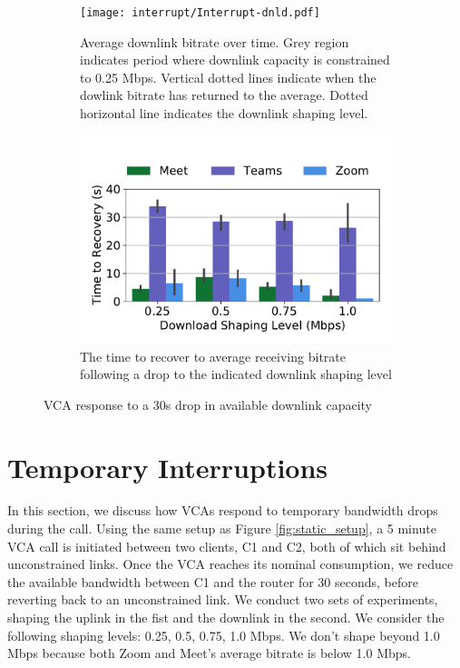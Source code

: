 
\begin{figure}[h!]
\begin{subfigure}[t]{.5\textwidth}
   \centering
    \texttt{[image: interrupt/Interrupt-dnld.pdf]}
    \captionsetup{width=.9\linewidth}
    \caption{Average downlink bitrate over time. Grey region indicates period where downlink capacity is constrained to 0.25 Mbps. Vertical dotted lines indicate when the dowlink bitrate has returned to the average. Dotted horizontal line indicates the downlink shaping level.}
    \label{fig:ts-dnld}
\end{subfigure}
\begin{subfigure}[t]{.5\textwidth}
  \centering
    \includegraphics[width=1\textwidth,keepaspectratio]{../figures/interrupt/TTR-dnld.pdf}
    \captionsetup{width=.9\linewidth}
    \caption{The time to recover to average receiving bitrate following a drop to the indicated downlink shaping level}
    \label{fig:TTR_dnld}
\end{subfigure}
\caption{VCA response to a 30s drop in available downlink capacity}
\label{fig:interrupt-dnld}
\end{figure}

\section{Temporary Interruptions}
\label{sec:interruption}






In this section, we discuss how VCAs respond to temporary bandwidth drops during the call. Using the same setup as Figure \ref{fig:static_setup}, a 5 minute VCA call is initiated between two clients, C1 and C2, both of which sit behind unconstrained links. Once the VCA reaches its nominal consumption, we reduce the available bandwidth between C1 and the router for 30 seconds, before reverting back to an unconstrained link. We conduct two sets of experiments, shaping the uplink in the fist and the downlink in the second. We consider the following shaping levels: {0.25, 0.5, 0.75, 1.0} Mbps. We don't shape beyond 1.0 Mbps because both Zoom and Meet's average bitrate is below 1.0 Mbps.


